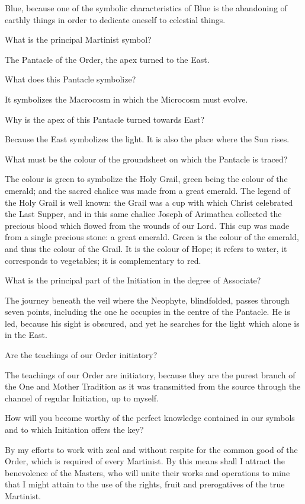 \unk{}	Blue, because one of the symbolic characteristics of Blue is the abandoning 
of earthly things in order to dedicate oneself to celestial things. 

\mi{}	What is the principal Martinist symbol? 

\unk{}	The Pantacle of the Order, the apex turned to the East. 

\mi{}	What does this Pantacle symbolize? 

\unk{}	It symbolizes the Macrocosm in which the Microcosm must evolve. 

\mi{}	Why is the apex of this Pantacle turned towards East? 

\unk{}	Because the East symbolizes the light. It is also the place where the Sun rises. 

\mi{}	What must be the colour of the groundsheet on which the Pantacle is traced? 

\unk{}	The colour is green to symbolize the Holy Grail, green being the colour of the emerald; and the sacred chalice was made from a great emerald. The legend of the Holy Grail is well known: the Grail was a cup with which Christ celebrated the Last Supper, and in this same chalice Joseph of Arimathea collected the precious blood which flowed from the wounds of our Lord. This cup was made from a single precious stone: a great emerald. Green is the colour of the emerald, and thus the colour of the Grail. It is the colour of Hope; it refers to water, it corresponds to vegetables; it is complementary to red. 

\mi{}	What is the principal part of the Initiation in the degree of Associate? 

\unk{}	The journey beneath the veil where the Neophyte, blindfolded, passes through seven points, including the one he occupies in the centre of the Pantacle. He is led, because his sight is obscured, and yet he searches for the light which alone is in the East. 

\mi{}	Are the teachings of our Order initiatory? 

\unk{}	The teachings of our Order are initiatory, because they are the purest branch of the One and Mother Tradition as it was transmitted from the source through the channel of regular Initiation, up to myself. 

\mi{}	How will you become worthy of the perfect knowledge contained in our symbols and to which Initiation offers the key? 

\unk{}	By my efforts to work with zeal and without respite for the common good of the Order, which is required of every Martinist. By this means shall I attract the benevolence of the Masters, who will unite their works and operations to mine that I might attain to the use of the rights, fruit and prerogatives of the true Martinist. 

